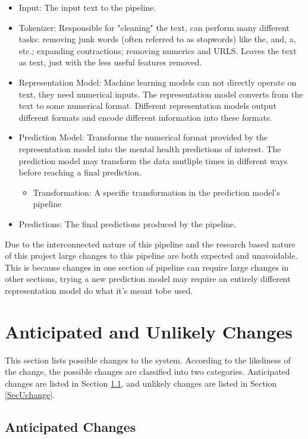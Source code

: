\documentclass[12pt, titlepage]{article}
\begin{document}
\begin{itemize}
    \item Input: The input text to the pipeline.
    \item Tokenizer: Responsible for "cleaning" the text, can perform many different tasks: removing junk words (often referred to as stopwords) like the, and, a, etc.; expanding contractions; removing numerics and URLS. Leaves the text as text, just with the less useful features removed.
    \item Representation Model: Machine learning models can not directly operate on text, they need numerical inputs. The representation model converts from the text to some numerical format. Different representation models output different formats and encode different information into these formats.
    \item Prediction Model: Transforms the numerical format provided by the representation model into the mental health predictions of interest. The prediction model may transform the data mutliple times in different ways before reaching a final prediction.
    \begin{itemize}
        \item Transformation: A specific transformation in the prediction model's pipeline
    \end{itemize}
    \item Predictions: The final predictions produced by the pipeline.
\end{itemize}

Due to the interconnected nature of this pipeline and the research based nature of this project large changes to this pipeline are both expected and unavoidable. This is because changes in one section of pipeline can require large changes in other sections, trying a new prediction model may require an entirely different representation model do what it's meant tobe used.

\section{Anticipated and Unlikely Changes} \label{SecChange}

This section lists possible changes to the system. According to the likeliness
of the change, the possible changes are classified into two
categories. Anticipated changes are listed in Section \ref{SecAchange}, and
unlikely changes are listed in Section \ref{SecUchange}.

\subsection{Anticipated Changes} \label{SecAchange}
\end{document}

